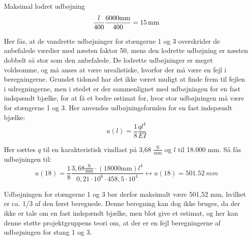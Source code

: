 Maksimal lodret udbøjning
\begin{equation}
\frac{l}{400}
\\
\frac{6000 \text{mm}}{400} = \SI{15}{mm}
\end{equation}

Her fås, at de vandrette udbøjninger for stængerne 1 og 3 overskrider de anbefalede værdier med næsten faktor 50, mens den lodrette udbøjning er næsten dobbelt så stor som den anbefalede. De lodrette udbøjninger er meget voldsomme, og må anses at være urealistiske, hvorfor der må være en fejl i beregningerne. Grundet tidsnød har det ikke været muligt at finde frem til fejlen i udregningerne, men i stedet er der sammenlignet med udbøjningen for en fast indspændt bjælke, for at få et bedre estimat for, hvor stor udbøjningen må være for stængerne 1 og 3. 
\newline \indent{     }  Her anvendes udbøjningsformlen for en fast indspændt bjælke:
\begin{equation}
u(l)=\frac{1}{8} \frac{ql^4}{EI}
\end{equation}

Her sættes $q$ til en karakteristisk vindlast på 3,68 $\frac{\text{N}}{\text{mm}}$ og $l$ til 18.000 mm. Så fås udbøjningen til: 
\begin{equation}
u(18) = \frac{1}{8} \frac{3,68\frac{\text{N}}{\text{mm}} \cdot (18000 \text{mm})l^4}{0,21 \cdot 10^6 \cdot 458,5 \cdot 10^4} \leftrightarrow u(18) = \SI{501,52}{mm}
\end{equation}

Udbøjningen for stængerne 1 og 3 bør derfor maksimalt være 501,52 mm, hvilket er ca. 1/3 af den først beregnede. Denne beregning kan dog ikke bruges, da der ikke er tale om en fast indspændt bjælke, men blot give et estimat, og her kan denne støtte projektgruppens teori om, at der er en fejl beregningerne af udbøjningen for stang 1 og 3.

